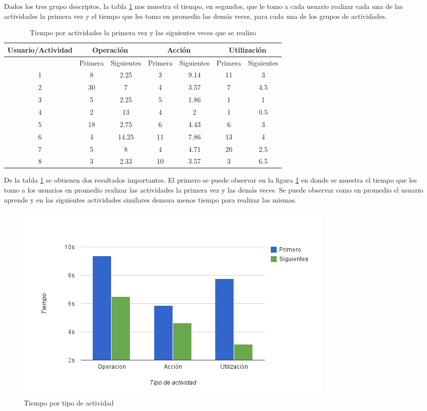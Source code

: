 Dados los tres grupo descriptos, la tabla \ref{tab:interfaz_tiempo_actividades} nos muestra el tiempo, en segundos, que le tomo a cada usuario realizar cada una de las actividades la primera vez y el tiempo que les tomo en promedio las demás veces, para cada una de los grupos de actividades.

\begin{table}[!hbt]
\centering
\begin{tabular}{|c|c|c|c|c|c|c|}
\hline
\rowcolor{gris} \textbf{Usuario/Actividad} & \multicolumn{2}{|c|}{\textbf{Operación}} & \multicolumn{2}{|c|}{\textbf{Acción}} & \multicolumn{2}{|c|}{\textbf{Utilización}}\\
\hline
\rowcolor{gris}  & Primera & Siguientes & Primera & Siguientes & Primera & Siguientes \\
\hline
1 & 8 & 2.25 & 3 & 9.14 & 11 & 3 \\
\hline
2 & 30 & 7 & 4 & 3.57 & 7 & 4.5 \\
\hline
3 & 5 & 2.25 & 5 & 1.86 & 1 & 1 \\
\hline
4 & 2 & 13 & 4 & 2 & 1 & 0.5 \\
\hline
5 & 18 & 2.75 & 6 & 4.43 & 6 & 3 \\
\hline
6 & 4 & 14.25 & 11 & 7.86 & 13 & 4 \\
\hline
7 & 5 & 8 & 4 & 4.71 & 20 & 2.5 \\
\hline
8 & 3 & 2.33 & 10 & 3.57 & 3 & 6.5 \\
\hline
\end{tabular}
\caption{Tiempo por actividades la primera vez y las siguientes veces que se realizo}
\label{tab:interfaz_tiempo_actividades}
\end{table}


De la tabla \ref{tab:interfaz_tiempo_actividades} se obtienen dos resultados importantes. El primero se puede observar en la figura \ref{fig:interfaz_tiempo_actividades} en donde se muestra el tiempo que les tomo a los usuarios en promedio realizar las actividades la primera vez y las demás veces. Se puede observar como en promedio el usuario aprende y en las siguientes actividades similares demora menos tiempo para realizar las mismas.

\begin{figure}[ht!]
\centering
\includegraphics[scale=0.8]{resultados/imagenes/interfaz_tiempo_actividades.png}
\caption{Tiempo por tipo de actividad}
\label{fig:interfaz_tiempo_actividades}
\end{figure}
 
